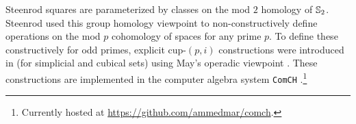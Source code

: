 \begin{remark*}
	Steenrod squares are parameterized by classes on the mod $2$ homology of $\mathbb{S}_2$.
	Steenrod used this group homology viewpoint to non-constructively define operations on the mod $p$ cohomology of spaces \cite{steenrod1952reduced, steenrod1953cyclic, steenrod1962cohomology} for any prime $p$.
	To define these constructively for odd primes, explicit cup-$(p,i)$ constructions were introduced in \cite{medina2021may_st} (for simplicial and cubical sets) using May's operadic viewpoint \cite{may1970general}.
	These constructions are implemented in the computer algebra system \texttt{ComCH} \cite{medina2021comch}.\footnote{Currently hosted at \url{https://github.com/ammedmar/comch}.}
\end{remark*}
